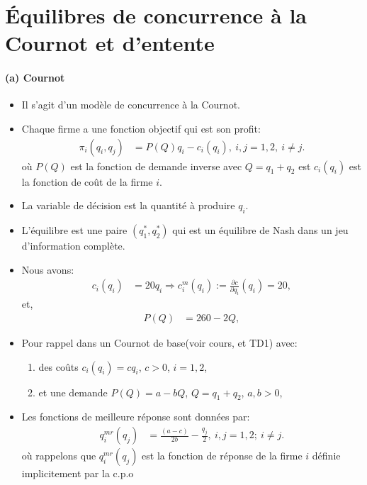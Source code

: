 \section{Équilibres de concurrence à la Cournot et d'entente}
\frame{\sectionpage}
\begin{frame}[allowframebreaks]{\insertsection}
\framesubtitle{(a) Cournot}
\begin{itemize}
    \item Il s'agit d'un modèle de concurrence à la Cournot. 
        \item Chaque firme a une fonction objectif qui est son profit: 
        \begin{align*}
            \pi_i(q_i, q_j) &= P(Q)q_i -c_i(q_i),  \ i, j= 1, 2, \ i\neq j.
        \end{align*}
        où $P(Q)$ est la fonction de demande inverse avec $Q = q_1 + q_2$ est $c_i(q_i)$ 
        est la fonction de coût de la firme $i$.
        \item La variable de décision est la quantité à produire $q_i$. 
        \item L'équilibre est une paire $(q_1^*, q_2^*)$ qui est un équilibre de Nash dans un jeu d'information complète.
        \item Nous avons: 
        \begin{align*}
            c_i(q_i)&= 20 q_i \Rightarrow c^m_i(q_i) :=\frac{\partial c}{\partial q_i}(q_i) = 20,
        \end{align*}
        et,
        \begin{align*}
           P(Q) &= 260 - 2Q, 
        \end{align*}
        \item Pour rappel dans un Cournot de base(voir cours, et TD1) avec:
        \begin{enumerate}[$\cdot$]
        \item des coûts $c_i(q_i) = cq_i$, $c>0$, $i=1, 2$,
         \item et une demande $P(Q) = a - bQ$, $Q=q_1+q_2$, $a, b > 0$,
         \end{enumerate}
         \item Les fonctions de meilleure réponse sont données par:
         \begin{align*}
         q_i^{mr}(q_j) &= \frac{(a-c)}{2b} - \frac{q_j}{2}, \ i, j = 1, 2; \ i\neq j. 
         \end{align*}
          où rappelons que $q_i^{mr}(q_j)$ est la fonction de réponse de la firme $i$ définie implicitement par la c.p.o 

\end{itemize}
\end{frame}
